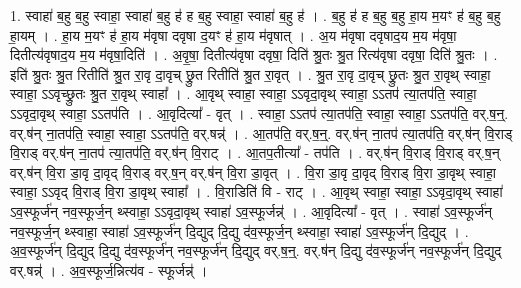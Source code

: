 \documentclass[17pt]{extarticle}
\begin{document}
1. स्वाहा॑ ब॒हु ब॒हु स्वाहा॒ स्वाहा॑ ब॒हु ह॑ ह ब॒हु स्वाहा॒ स्वाहा॑ ब॒हु ह॑ । . ब॒हु ह॑ ह ब॒हु ब॒हु हा॒य म॒यꣳ ह॑ ब॒हु ब॒हु हा॒यम् । . हा॒य म॒यꣳ ह॑ हा॒य म॑वृषा दवृषा द॒यꣳ ह॑ हा॒य म॑वृषात् । . अ॒य म॑वृषा दवृषाद॒य म॒य म॑वृषा॒ दितीत्य॑वृषाद॒य म॒य म॑वृषा॒दिति॑ । . अ॒वृ॒षा॒ दितीत्य॑वृषा दवृषा॒ दिति॑ श्रु॒तः श्रु॒त रित्य॑वृषा दवृषा॒ दिति॑ श्रु॒तः । . इति॑ श्रु॒तः श्रु॒त रितीति॑ श्रु॒त रा॒वृ दा॒वृच् छ्रु॒त रितीति॑ श्रु॒त रा॒वृत् । . श्रु॒त रा॒वृ दा॒वृच् छ्रु॒तः श्रु॒त रा॒वृथ् स्वाहा॒ स्वाहा॒ ऽऽवृच्छ्रु॒तः श्रु॒त रा॒वृथ् स्वाहा᳚ । . आ॒वृथ् स्वाहा॒ स्वाहा॒ ऽऽवृदा॒वृथ् स्वाहा॒ ऽऽतप॑ त्या॒तप॑ति॒ स्वाहा॒ ऽऽवृदा॒वृथ् स्वाहा॒ ऽऽतप॑ति । . आ॒वृदित्या᳚ - वृत् । . स्वाहा॒ ऽऽतप॑ त्या॒तप॑ति॒ स्वाहा॒ स्वाहा॒ ऽऽतप॑ति॒ वर्.ष॒न्॒. वर्.ष॑न् ना॒तप॑ति॒ स्वाहा॒ स्वाहा॒ ऽऽतप॑ति॒ वर्.षन्न्॑ । . आ॒तप॑ति॒ वर्.ष॒न्॒. वर्.ष॑न् ना॒तप॑ त्या॒तप॑ति॒ वर्.ष॑न् वि॒राड् वि॒राड् वर्.ष॑न् ना॒तप॑ त्या॒तप॑ति॒ वर्.ष॑न् वि॒राट् । . आ॒तप॒तीत्या᳚ - तप॑ति । . वर्.ष॑न् वि॒राड् वि॒राड् वर्.ष॒न् वर्.ष॑न् वि॒रा डा॒वृ दा॒वृद् वि॒राड् वर्.ष॒न् वर्.ष॑न् वि॒रा डा॒वृत् । . वि॒रा डा॒वृ दा॒वृद् वि॒राड् वि॒रा डा॒वृथ् स्वाहा॒ स्वाहा॒ ऽऽवृद् वि॒राड् वि॒रा डा॒वृथ् स्वाहा᳚ । . वि॒राडिति॑ वि - राट् । . आ॒वृथ् स्वाहा॒ स्वाहा॒ ऽऽवृदा॒वृथ् स्वाहा॑ ऽव॒स्फूर्ज॑न् नव॒स्फूर्ज॒न् थ्स्वाहा॒ ऽऽवृदा॒वृथ् स्वाहा॑ ऽव॒स्फूर्जन्न्॑ । . आ॒वृदित्या᳚ - वृत् । . स्वाहा॑ ऽव॒स्फूर्ज॑न् नव॒स्फूर्ज॒न् थ्स्वाहा॒ स्वाहा॑ ऽव॒स्फूर्ज॑न् दि॒द्युद् दि॒द्यु द॑व॒स्फूर्ज॒न् थ्स्वाहा॒ स्वाहा॑ ऽव॒स्फूर्ज॑न् दि॒द्युद् । . अ॒व॒स्फूर्ज॑न् दि॒द्युद् दि॒द्यु द॑व॒स्फूर्ज॑न् नव॒स्फूर्ज॑न् दि॒द्युद् वर्.ष॒न्॒. वर्.ष॑न् दि॒द्यु द॑व॒स्फूर्ज॑न् नव॒स्फूर्ज॑न् दि॒द्युद् वर्.षन्न्॑ । . अ॒व॒स्फूर्ज॒न्नित्य॑व - स्फूर्जन्न्॑ । \newline
\end{document}
